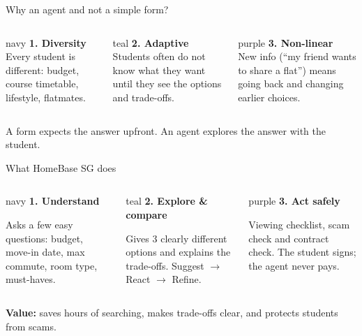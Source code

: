 \documentclass[aspectratio=169,11pt]{beamer}
\begin{document}
\begin{frame}{Why an agent and not a simple form?}
\begin{columns}[T]
\begin{card}{navy}
\textbf{1. Diversity}\\[2pt]
\small Every student is different: budget, course timetable, lifestyle, flatmates.
\end{card}
\begin{card}{teal}
\textbf{2. Adaptive}\\[2pt]
\small Students often do not know what they want until they see the options and trade-offs.
\end{card}
\begin{card}{purple}
\textbf{3. Non-linear}\\[2pt]
\small New info (``my friend wants to share a flat'') means going back and changing earlier choices.
\end{card}
\end{columns}

\vspace{10pt}
\centering
A form expects the answer upfront. \alert{An agent explores the answer with the student.}
\end{frame}

\begin{frame}{What HomeBase SG does}
\centering
\begin{columns}[T]
\begin{card}{navy}
\centering\textbf{1. Understand}\\[3pt]
\raggedright\small Asks a few easy questions: budget, move-in date, max commute, room type, must-haves.
\end{card}
\begin{card}{teal}
\centering\textbf{2. Explore \& compare}\\[3pt]
\raggedright\small Gives 3 clearly different options and explains the trade-offs. Suggest $\rightarrow$ React $\rightarrow$ Refine.
\end{card}
\begin{card}{purple}
\centering\textbf{3. Act safely}\\[3pt]
\raggedright\small Viewing checklist, scam check and contract check. The student signs; the agent never pays.
\end{card}
\end{columns}

\vspace{10pt}
\small\textbf{Value:} saves hours of searching, makes trade-offs clear, and protects students from scams.
\end{frame}
\end{document}
